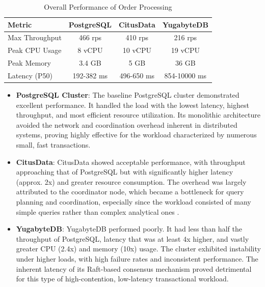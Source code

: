 \begin{table}[H]
    \caption{Overall Performance of Order Processing}
    \label{tab:perf_summary}
    \centering
    \begin{tabular}{|l|c|c|c|}
        \hline
        \textbf{Metric} & \textbf{PostgreSQL} & \textbf{CitusData} & \textbf{YugabyteDB} \\
        \hline
        Max Throughput  & 466 rps             & 410 rps            & 216 rps             \\
        \hline
        Peak CPU Usage  & 8 vCPU              & 10 vCPU            & 19 vCPU             \\
        \hline
        Peak Memory     & 3.4 GB              & 5 GB               & 36 GB               \\
        \hline
        Latency (P50)   & 192-382 ms          & 496-650 ms         & 854-10000 ms        \\
        \hline
    \end{tabular}
\end{table}

\begin{itemize}
    \item \textbf{PostgreSQL Cluster}: The baseline PostgreSQL cluster demonstrated excellent performance. It handled the load with the lowest latency, highest throughput, and most efficient resource utilization. Its monolithic architecture avoided the network and coordination overhead inherent in distributed systems, proving highly effective for the workload characterized by numerous small, fast transactions.

    \item \textbf{CitusData}: CitusData showed acceptable performance, with throughput approaching that of PostgreSQL but with significantly higher latency (approx. 2x) and greater resource consumption. The overhead was largely attributed to the coordinator node, which became a bottleneck for query planning and coordination, especially since the workload consisted of many simple queries rather than complex analytical ones \cite{Slot2020}.

    \item \textbf{YugabyteDB}: YugabyteDB performed poorly. It had less than half the throughput of PostgreSQL, latency that was at least 4x higher, and vastly greater CPU (2.4x) and memory (10x) usage. The cluster exhibited instability under higher loads, with high failure rates and inconsistent performance. The inherent latency of its Raft-based consensus mechanism proved detrimental for this type of high-contention, low-latency transactional workload.

\end{itemize}

